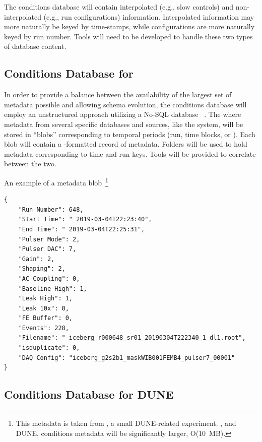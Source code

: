 \documentclass[../main-v1.tex]{subfiles}
\begin{document}
The conditions database will contain interpolated (e.g., slow controls) and non-interpolated (e.g., run configurations) information. Interpolated information may more naturally be keyed by time-stamps, while configurations are more naturally keyed by run number. Tools will need to be developed to handle these two  
types of database content. 

\subsection{Conditions Database for }

In order to provide a balance between the availability of the largest set of metadata possible  and allowing schema evolution,  the  conditions database will employ an unstructured approach utilizing a No-SQL database ~\cite{bib:ucondb}. The  where metadata from several specific databases and sources, like the  system, will be stored in ``blobs'' corresponding to temporal periods (run, time blocks, or ). Each blob will contain a -formatted record of metadata. Folders will be used to hold metadata corresponding to time and run keys. Tools will be provided to correlate between the two. 

An example of a metadata blob~\footnote{This metadata is taken from , a small DUNE-related experiment. , and DUNE, conditions metadata will be significantly larger, O(10~MB).}

\begin{verbatim}
{
    "Run Number": 648,
    "Start Time": " 2019-03-04T22:23:40",
    "End Time": " 2019-03-04T22:25:31",
    "Pulser Mode": 2,
    "Pulser DAC": 7,
    "Gain": 2,
    "Shaping": 2,
    "AC Coupling": 0,
    "Baseline High": 1,
    "Leak High": 1,
    "Leak 10x": 0,
    "FE Buffer": 0,
    "Events": 228,
    "Filename": " iceberg_r000648_sr01_20190304T222340_1_dl1.root",
    "isduplicate": 0,
    "DAQ Config": "iceberg_g2s2b1_maskWIB001FEMB4_pulser7_00001"
}
\end{verbatim}


\subsection{Conditions Database for DUNE}
\end{document}
